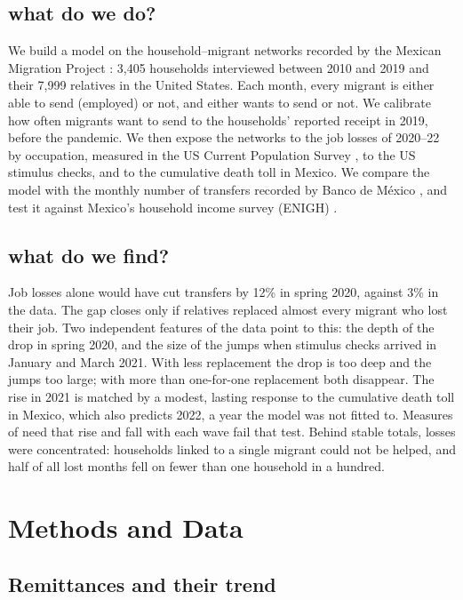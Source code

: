 \documentclass[11pt]{article}
\begin{document}
\subsection{what do we do?}
{
We build a model on the household--migrant networks recorded by the Mexican Migration Project \cite{mmp}: 3,405 households interviewed between 2010 and 2019 and their 7,999 relatives in the United States. Each month, every migrant is either able to send (employed) or not, and either wants to send or not. We calibrate how often migrants want to send to the households' reported receipt in 2019, before the pandemic. We then expose the networks to the job losses of 2020--22 by occupation, measured in the US Current Population Survey \cite{ipumscps}, to the US stimulus checks, and to the cumulative death toll in Mexico. We compare the model with the monthly number of transfers recorded by Banco de M\'exico \cite{banxico}, and test it against Mexico's household income survey (ENIGH) \cite{enigh}.
}

\subsection{what do we find?}
{
Job losses alone would have cut transfers by 12\% in spring 2020, against 3\% in the data. The gap closes only if relatives replaced almost every migrant who lost their job. Two independent features of the data point to this: the depth of the drop in spring 2020, and the size of the jumps when stimulus checks arrived in January and March 2021. With less replacement the drop is too deep and the jumps too large; with more than one-for-one replacement both disappear. The rise in 2021 is matched by a modest, lasting response to the cumulative death toll in Mexico, which also predicts 2022, a year the model was not fitted to. Measures of need that rise and fall with each wave fail that test. Behind stable totals, losses were concentrated: households linked to a single migrant could not be helped, and half of all lost months fell on fewer than one household in a hundred.
}

\section{Methods and Data}

\subsection{Remittances and their trend}
\end{document}
